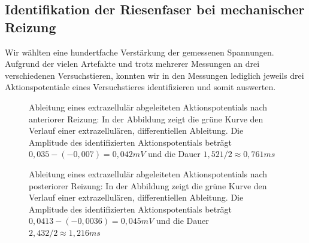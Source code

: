 \documentclass[11pt]{article}
\begin{document}
\subsection{Identifikation der Riesenfaser bei mechanischer Reizung}
Wir wählten eine hundertfache Verstärkung der gemessenen Spannungen.\\
Aufgrund der vielen Artefakte und trotz mehrerer Messungen an drei verschiedenen Versuchstieren, konnten wir in den Messungen lediglich jeweils drei Aktionspotentiale eines Versuchstieres identifizieren und somit auswerten. 

\begin{figure}[H]
\caption{Ableitung eines extrazellulär abgeleiteten Aktionspotentials nach anteriorer Reizung: In der Abbildung zeigt die grüne Kurve den Verlauf einer extrazellulären, differentiellen Ableitung.  Die Amplitude des identifizierten Aktionspotentials beträgt $0,035-(-0,007)=0,042 mV$ und die Dauer $1,521/2 \approx 0,761 ms$ }
\label{ant}
\end{figure}

\begin{figure}[H]
\caption{Ableitung eines extrazellulär abgeleiteten Aktionspotentials nach posteriorer Reizung: In der Abbildung zeigt die grüne Kurve den Verlauf einer extrazellulären, differentiellen Ableitung.  Die Amplitude des identifizierten Aktionspotentials beträgt $0,0413-(-0,0036)=0,045 mV$ und die Dauer $2,432/2 \approx 1,216 ms$ }
\label{post}
\end{figure}
\end{document}
